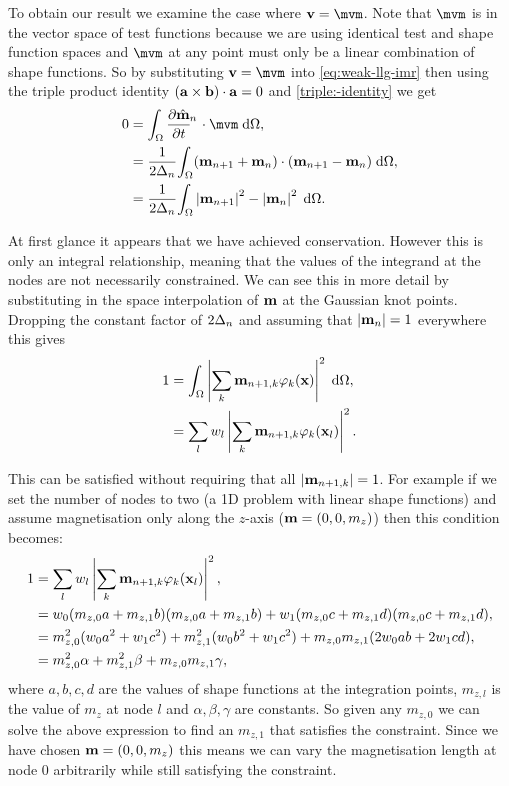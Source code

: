 To obtain our result we examine the case where $\testv = \mvm$.
Note that $\mvm$ is in the vector space of test functions because we are using identical test and shape function spaces and $\mvm$ at any point must only be a linear combination of shape functions.
So by substituting $\testv = \mvm$ into \cref{eq:weak-llg-imr} then using the triple product identity $({\mathbf{a}} \times {\mathbf{b}}) \cdot {\mathbf{a}} = 0$ and \cref{triple:-identity} we get
\begin{equation}
  \label{eq:23}
  \begin{aligned}
    0 &= \ipg{\dmdtm}{\mvm}, \\
    &= \frac{1}{2\dtn} \intd{(\mv_{n+1} + \mv_{n}) \cdot (\mv_{n+1} - \mv_n)}, \\
    &= \frac{1}{2\dtn} \intd{\abs{\mv_{n+1}}^2 - \abs{\mv_{n}}^2}.
  \end{aligned}
\end{equation}

At first glance it appears that we have achieved conservation.
However this is only an integral relationship, meaning that the values of the integrand at the nodes are not necessarily constrained.
We can see this in more detail by substituting in the space interpolation of $\mathbf{m}$ at the Gaussian knot points.
Dropping the constant factor of $2\Delta_{n}$ and assuming that $\left|{\mathbf{m}_n} \right| = 1$ everywhere this gives
\begin{equation}
  \begin{aligned} 
    1 &= {\int_{\Omega} \left|{\sum_k \mathbf{m}_{n+1, k} \varphi_k(\mathbf{x})} \right|^2 {\; \text{d}} {\Omega}}, \\
    &= \sum_l w_l \left|{\sum_k \mathbf{m}_{n+1, k} \varphi_k(\mathbf{x}_l)} \right|^2.
  \end{aligned} 
\end{equation}

This can be satisfied without requiring that all $\left|{\mathbf{m}_{n+1, k}} \right| = 1$.
For example if we set the number of nodes to two (a 1D problem with linear shape functions) and assume magnetisation only along the $z$-axis (\ie  $\mathbf{m} = (0, 0, m_z)$) then this condition becomes:
\begin{equation}
  \begin{aligned}
    1 &= \sum_l w_l \left|{\sum_k \mathbf{m}_{n+1, k} \varphi_k(\mathbf{x}_l)} \right|^2, \\
    &= w_0 (m_{z,0} a + m_{z,1} b)(m_{z,0} a + m_{z,1} b) + w_1 (m_{z,0} c + m_{z,1} d)(m_{z,0} c + m_{z,1} d), \\
    &= m_{z,0}^2 (w_0 a^2 + w_1 c^2) + m_{z,1}^2 (w_0 b^2 + w_1 c^2) + m_{z,0} m_{z,1} (2w_0ab + 2w_1cd), \\
    &= m_{z,0}^2 \alpha + m_{z,1}^2 \beta + m_{z,0} m_{z,1} \gamma, \\
  \end{aligned}
\end{equation}
where $a,b,c,d$ are the values of shape functions at the integration points, $m_{z,l}$ is the value of $m_z$ at node $l$ and $\alpha, \beta, \gamma$ are constants.
So given any $m_{z,0}$ we can solve the above expression to find an $m_{z,1}$ that satisfies the constraint.
Since we have chosen $\mathbf{m} = (0, 0, m_z)$ this means we can vary the magnetisation length at node 0 arbitrarily while still satisfying the constraint.

